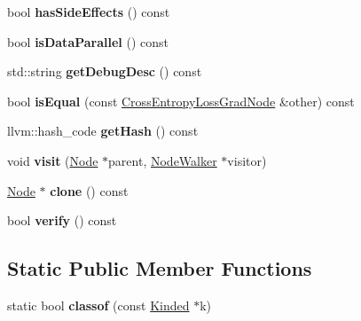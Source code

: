 \begin{DoxyCompactItemize}
\item 
\mbox{\label{classglow_1_1_cross_entropy_loss_grad_node_a00d148a02a0068547e326bf98fd27aa0}} 
bool {\bfseries has\+Side\+Effects} () const
\item 
\mbox{\label{classglow_1_1_cross_entropy_loss_grad_node_af64acce407f230eff8e664bb98236ea3}} 
bool {\bfseries is\+Data\+Parallel} () const
\item 
\mbox{\label{classglow_1_1_cross_entropy_loss_grad_node_a95e875fee2c41839ccb294526f9caef5}} 
std\+::string {\bfseries get\+Debug\+Desc} () const
\item 
\mbox{\label{classglow_1_1_cross_entropy_loss_grad_node_a6ac169ca9b888fd523053ea77c5e2ad4}} 
bool {\bfseries is\+Equal} (const \hyperlink{classglow_1_1_cross_entropy_loss_grad_node}{Cross\+Entropy\+Loss\+Grad\+Node} \&other) const
\item 
\mbox{\label{classglow_1_1_cross_entropy_loss_grad_node_a762cf3d5defdf4f301390f437a876803}} 
llvm\+::hash\+\_\+code {\bfseries get\+Hash} () const
\item 
\mbox{\label{classglow_1_1_cross_entropy_loss_grad_node_ab067119ea33e290023d7ba0210f84837}} 
void {\bfseries visit} (\hyperlink{classglow_1_1_node}{Node} $\ast$parent, \hyperlink{classglow_1_1_node_walker}{Node\+Walker} $\ast$visitor)
\item 
\mbox{\label{classglow_1_1_cross_entropy_loss_grad_node_a4c927e0f288ea3b2550c96d18caf15bb}} 
\hyperlink{classglow_1_1_node}{Node} $\ast$ {\bfseries clone} () const
\item 
\mbox{\label{classglow_1_1_cross_entropy_loss_grad_node_a05d5ecc9d1b3e0c762cd6c3f6475041d}} 
bool {\bfseries verify} () const
\end{DoxyCompactItemize}
\subsection*{Static Public Member Functions}
\begin{DoxyCompactItemize}
\item 
\mbox{\label{classglow_1_1_cross_entropy_loss_grad_node_a993d7bf3c46b42393af9e46615f1a8c0}} 
static bool {\bfseries classof} (const \hyperlink{classglow_1_1_kinded}{Kinded} $\ast$k)
\end{DoxyCompactItemize}
